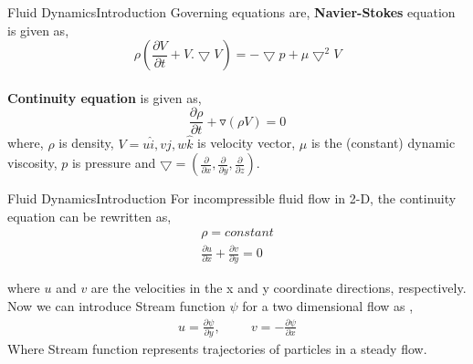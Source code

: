 \documentclass[11pt]{beamer}
\begin{document}
\begin{frame}{Fluid Dynamics}{Introduction}
Governing equations are,
\linebreak
\linebreak
\textbf{Navier-Stokes} equation is given as,
\begin{equation} \label{eqn1}
\rho\left(\frac{\partial V}{\partial t} + V. \bigtriangledown V\right) =- \bigtriangledown p +  \mu\bigtriangledown^2 V  
\end{equation}\\

\textbf{Continuity equation} is given as,
\begin{equation}
\frac{\partial \rho}{\partial t} + \triangledown (\rho  V) = 0
\end{equation}
where, $\rho$ is density, $V = u\hat{i}, v\hat{j}, w\hat{k}$ is velocity vector, $\mu$ is the (constant) dynamic viscosity, $p$ is pressure and $\bigtriangledown = \left( \frac{\partial}{\partial x} , \frac{\partial}{\partial y} , \frac{\partial}{\partial z} \right)$.
\end{frame}

\begin{frame}{Fluid Dynamics}{Introduction}
For incompressible fluid flow in 2-D, the continuity equation can be rewritten as,
\begin{eqnarray}
\rho = constant \nonumber\\
\frac{\partial u}{\partial x} + \frac{\partial v}{\partial y} = 0 
\end{eqnarray} 

where $u$ and $v$ are the velocities in the x and y coordinate directions, respectively. Now we can introduce Stream function $\psi$ for a two dimensional flow as ,
\begin{eqnarray}
u=\frac{\partial \psi}{\partial y}, \hspace{1cm} v=-\frac{\partial \psi}{\partial x}
\end{eqnarray}
Where Stream function represents trajectories of particles in a steady flow.
\end{frame}
\end{document}
